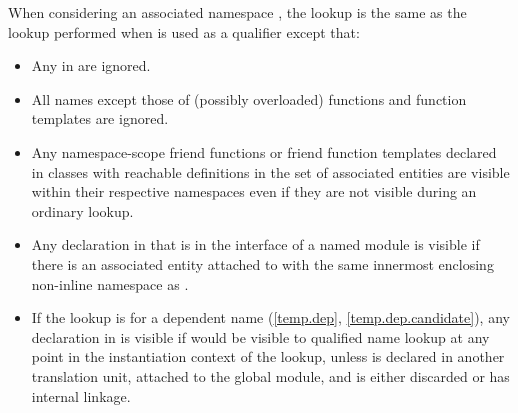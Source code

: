 \pnum
When considering an associated namespace ,
the lookup is the same as the
lookup performed when 
is used as a qualifier
except that:
\begin{itemize}
\item Any  in  are ignored.

\item All names except those of (possibly overloaded) functions and
function templates are ignored.

\item Any namespace-scope friend functions or friend function templates
declared in classes with reachable definitions in the set of associated entities
are visible within their respective
namespaces even if they are not visible during an ordinary
lookup.

\item
Any declaration  in 
that is in the interface of
a named module 
is visible
if there is an associated entity attached to 
with the same innermost enclosing non-inline namespace as .

\item
If the lookup is for a dependent name (\ref{temp.dep}, \ref{temp.dep.candidate}),
any declaration  in 
is visible
if  would be visible to qualified name lookup
at any point in the instantiation context of the lookup,
unless  is declared in another translation unit, attached to the global module,
and is either discarded or has internal linkage.
\end{itemize}

